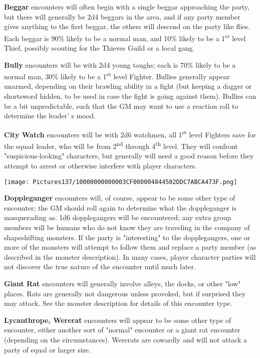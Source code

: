 \documentclass[a4paper,twoside,openany,10pt]{book}
\begin{document}
\begin{multicols}{2}
\textbf{Beggar} encounters will often begin with a single beggar approaching the party, but there will generally be 2d4 beggars in the area, and if any party member gives anything to the first beggar, the others will descend on the party like flies. Each beggar is 90\% likely to be a normal man, and 10\% likely to be a 1\textsuperscript{st} level Thief, possibly scouting for the Thieves Guild or a local gang.


\textbf{Bully} encounters will be with 2d4 young toughs; each is 70\% likely to be a normal man, 30\% likely to be a 1\textsuperscript{st} level Fighter. Bullies generally appear unarmed, depending on their brawling ability in a fight (but keeping a dagger or shortsword hidden, to be used in case the fight is going against them). Bullies can be a bit unpredictable, such that the GM may want to use a reaction roll to determine the leader' s mood.

\textbf{City Watch }encounters will be with 2d6 watchmen, all 1\textsuperscript{st} level Fighters save for the squad leader, who will be from 2\textsuperscript{nd} through 4\textsuperscript{th} level. They will confront "suspicious-looking" characters, but generally will need a good reason before they attempt to arrest or otherwise interfere with player characters.


\begin{flushleft} \texttt{[image: Pictures137/10000000000003CF000004844502DDC7ABCA473F.png]}  \end{flushleft}

\textbf{Doppleganger} encounters will, of course, appear to be some other type of encounter; the GM should roll again to determine what the doppleganger is masquerading as. 1d6 dopplegangers will be encountered; any extra group members will be humans who do not know they are traveling in the company of shapeshifting monsters. If the party is "interesting" to the dopplegangers, one or more of the monsters will attempt to follow them and replace a party member (as described in the monster description). In many cases, player character parties will not discover the true nature of the encounter until much later. 

\textbf{Giant Rat} encounters will generally involve alleys, the docks, or other "low" places. Rats are generally not dangerous unless provoked, but if surprised they may attack. See the monster description for details of this encounter type.

\textbf{Lycanthrope, Wererat} encounters will appear to be some other type of encounter, either another sort of "normal" encounter or a giant rat encounter (depending on the circumstances). Wererats are cowardly and will not attack a party of equal or larger size.


\end{multicols}
\end{document}
